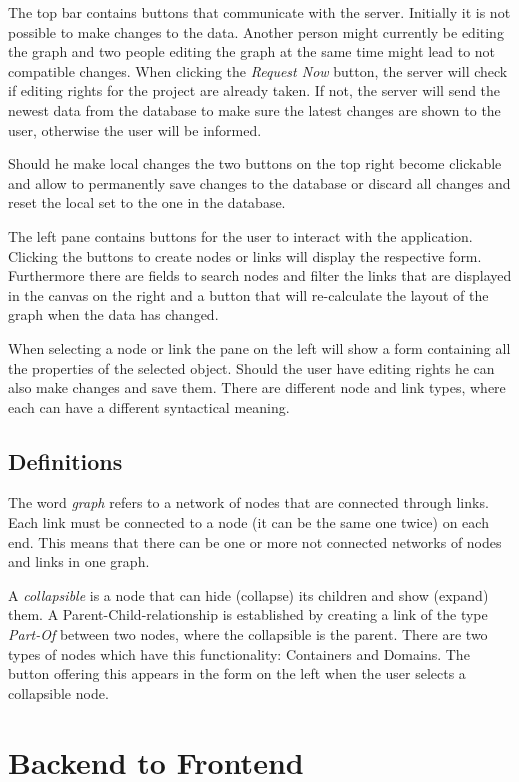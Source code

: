 The top bar contains buttons that communicate with the server. Initially it is not possible to make changes to the data. Another person might currently be editing the graph and two people editing the graph at the same time might lead to not compatible changes. When clicking the \emph{Request Now} button, the server will check if editing rights for the project are already taken. If not, the server will send the newest data from the database to make sure the latest changes are shown to the user, otherwise the user will be informed.

Should he make local changes the two buttons on the top right become clickable and allow to permanently save changes to the database or discard all changes and reset the local set to the one in the database.

The left pane contains buttons for the user to interact with the application. Clicking the buttons to create nodes or links will display the respective form.
Furthermore there are fields to search nodes and filter the links that are displayed in the canvas on the right and a button that will re-calculate the layout of the graph when the data has changed.

When selecting a node or link the pane on the left will show a form containing all the properties of the selected object. Should the user have editing rights he can also make changes and save them. There are different node and link types, where each can have a different syntactical meaning.

\section{Definitions}
The word \emph{graph} refers to a network of nodes that are connected through links. Each link must be connected to a node (it can be the same one twice) on each end. This means that there can be one or more not connected networks of nodes and links in one graph.

A \emph{collapsible} is a node that can hide (collapse) its children and show (expand) them. A Parent-Child-relationship is established by creating a link of the type \emph{Part-Of} between two nodes, where the collapsible is the parent. There are two types of nodes which have this functionality: Containers and Domains. The button offering this appears in the form on the left when the user selects a collapsible node.

\chapter{Backend to Frontend}

